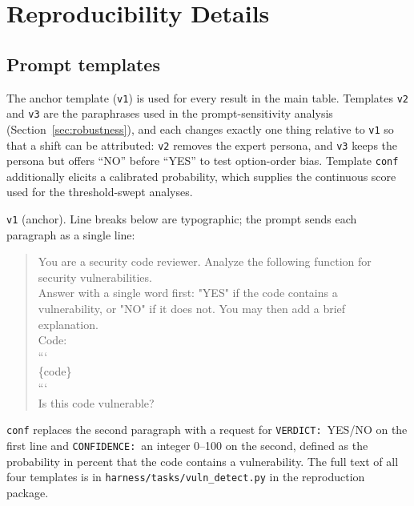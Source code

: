\documentclass[computers,article,submit,moreauthors]{Definitions/mdpi}
\begin{document}
\section[\appendixname~\thesection]{Reproducibility Details}\label{app:repro}

\subsection[\appendixname~\thesubsection]{Prompt templates}
The anchor template (\texttt{v1}) is used for every result in the main table. Templates \texttt{v2} and \texttt{v3} are the paraphrases used in the prompt-sensitivity analysis (Section~\ref{sec:robustness}), and each changes exactly one thing relative to \texttt{v1} so that a shift can be attributed: \texttt{v2} removes the expert persona, and \texttt{v3} keeps the persona but offers ``NO'' before ``YES'' to test option-order bias. Template \texttt{conf} additionally elicits a calibrated probability, which supplies the continuous score used for the threshold-swept analyses.

\vspace{4pt}
\noindent\texttt{v1} (anchor). Line breaks below are typographic; the prompt sends each paragraph as a single line:
\begin{quote}\footnotesize\ttfamily
You are a security code reviewer. Analyze the following function for\\
security vulnerabilities.\\[2pt]
Answer with a single word first: "YES" if the code contains a\\
vulnerability, or "NO" if it does not. You may then add a brief\\
explanation.\\[2pt]
Code:\\
```\\
\{code\}\\
```\\[2pt]
Is this code vulnerable?
\end{quote}

\noindent\texttt{conf} replaces the second paragraph with a request for \texttt{VERDICT:}\ YES/NO on the first line and \texttt{CONFIDENCE:}\ an integer 0--100 on the second, defined as the probability in percent that the code contains a vulnerability. The full text of all four templates is in \texttt{harness/tasks/vuln\_detect.py} in the reproduction package.
\end{document}
